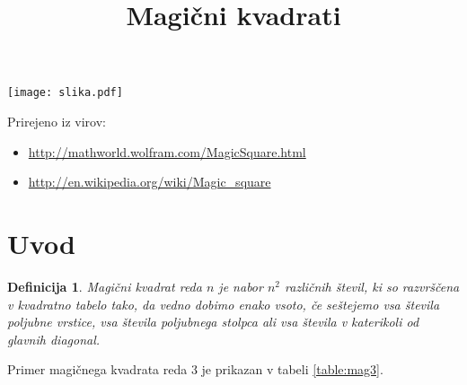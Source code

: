 \documentclass[a4paper,12pt]{article}
\title{Magični kvadrati}
\date{}
\newtheorem{definicija}[izrek]{Definicija}
\begin{document}
\maketitle
\newcommand{\pojem}[1]{\emph{\color{purple}#1}}
\renewcommand*{\proofname}{Dokaz izreka}
\begin{center}
   \texttt{[image: slika.pdf]}
\end{center}


Prirejeno iz virov:

\begin{itemize}
   \item \url{http://mathworld.wolfram.com/MagicSquare.html}
   \item \url{http://en.wikipedia.org/wiki/Magic_square}
\end{itemize}

\tableofcontents



\newpage

\section{Uvod}
\begin{definicija}
   \pojem{Magični kvadrat} reda $n$ je nabor $n^2$ različnih števil,
   ki so razvrščena v kvadratno tabelo tako, da vedno dobimo enako vsoto,
   če seštejemo vsa števila poljubne vrstice, vsa števila poljubnega
   stolpca ali vsa števila v katerikoli od glavnih diagonal.
\end{definicija}

Primer magičnega kvadrata reda 3 je prikazan v tabeli \ref{table:mag3}.
\end{document}
